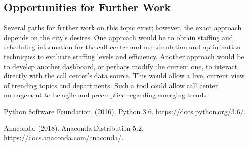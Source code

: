 \documentclass[11pt,twocolumn]{article}
\begin{document}
	\subsection{Opportunities for Further Work}

Several paths for further work on this topic exist; however, the exact approach depends on the city's desires.  One approach would be to obtain staffing and scheduling information for the call center and use simulation and optimization techniques to evaluate staffing levels and efficiency.  Another approach would be to develop another dashboard, or perhaps modify the current one, to interact directly with the call center's data source.  This would allow a live, current view of trending topics and departments.  Such a tool could allow call center management to be agile and preemptive regarding emerging trends.



\begin{thebibliography}{9}
	
Python Software Foundation. (2016). Python 3.6. https://docs.python.org/3.6/.

Anaconda. (2018). Anaconda Distribution 5.2. https://docs.anaconda.com/anaconda/.


\end{thebibliography}
%
\end{document}
